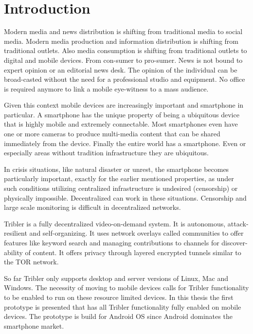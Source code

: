 \chapter{Introduction}\label{ch:intro}

Modern media and news distribution is shifting from traditional media to social media.
Modern media production and information distribution is shifting from traditional outlets.
Also media consumption is shifting from traditional outlets to digital and mobile devices.
From con-sumer to pro-sumer.
News is not bound to expert opinion or an editorial news desk.
The opinion of the individual can be broad-casted without the need for a professional studio and equipment.
No office is required anymore to link a mobile eye-witness to a mass audience.
\cite{news_crowd}

Given this context mobile devices are increasingly important and smartphone in particular.
A smartphone has the unique property of being a ubiquitous device that is highly mobile and extremely connectable.
Most smartphones even have one or more cameras to produce multi-media content that can be shared immediately from the device.
Finally the entire world has a smartphone.
Even or especially areas without tradition infrastructure they are ubiquitous.

In crisis situations, like natural disaster or unrest, the smartphone becomes particularly important, exactly for the earlier mentioned properties, as under such conditions utilizing centralized infrastructure is undesired (censorship) or physically impossible.
Decentralized can work in these situations.
Censorship and large scale monitoring is difficult in decentralized networks.
\cite{pouwelse2012censorshipfree}


Tribler is a fully decentralized video-on-demand system. \cite{TriblerOverviewJournal, tribler2014play, tribler-anon-hd}
It is autonomous, attack-resilient and self-organizing. \cite{votecast, tribler-gossip}
It uses network overlays called communities to offer features like keyword search and managing contributions to channels for discover-ability of content.
It offers privacy through layered encrypted tunnels similar to the TOR network.\cite{tribler2014at3, dingledine2004tor, dingledine2006design}

So far Tribler only supports desktop and server versions of Linux, Mac and Windows.
The necessity of moving to mobile devices calls for Tribler functionality to be enabled to run on these resource limited devices.
In this thesis the first prototype is presented that has all Tribler functionality fully enabled on mobile devices.
The prototype is build for Android OS since Android dominates the smartphone market.



